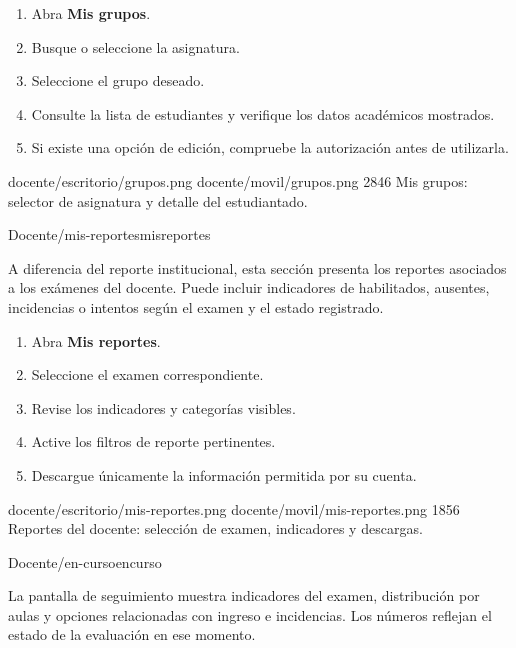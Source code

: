 \documentclass[11pt,a4paper]{article}
\begin{document}
\pasos
\begin{enumerate}
\item Abra \textbf{Mis grupos}.
\item Busque o seleccione la asignatura.
\item Seleccione el grupo deseado.
\item Consulte la lista de estudiantes y verifique
los datos académicos mostrados.
\item Si existe una opción de edición,
compruebe la autorización antes de utilizarla.
\end{enumerate}


\Pantallas
{docente/escritorio/grupos.png}
{docente/movil/grupos.png}
{2846}
{Mis grupos: selector de asignatura
y detalle del estudiantado.}


{Docente}{/mis-reportes}{misreportes}

A diferencia del reporte institucional, esta sección
presenta los reportes asociados a los exámenes del docente.
Puede incluir indicadores de habilitados, ausentes,
incidencias o intentos según el examen y el estado registrado.

\pasos
\begin{enumerate}
\item Abra \textbf{Mis reportes}.
\item Seleccione el examen correspondiente.
\item Revise los indicadores y categorías visibles.
\item Active los filtros de reporte pertinentes.
\item Descargue únicamente la información
permitida por su cuenta.
\end{enumerate}


\Pantallas
{docente/escritorio/mis-reportes.png}
{docente/movil/mis-reportes.png}
{1856}
{Reportes del docente: selección de examen,
indicadores y descargas.}


{Docente}{/en-curso}{encurso}

La pantalla de seguimiento muestra indicadores del examen,
distribución por aulas y opciones relacionadas con ingreso
e incidencias. Los números reflejan el estado de la
evaluación en ese momento.
\end{document}
